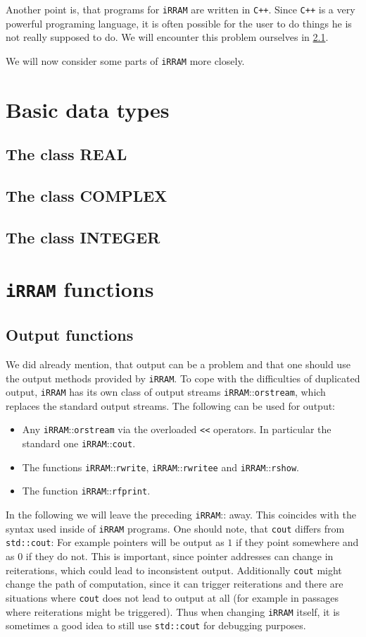 \documentclass{article}
\newcommand{\irram}{\texttt{iRRAM}\xspace}
\newcommand{\cc}{\texttt{C++}\xspace}
\newcommand{\ir}[1]{\texttt{#1}}
\newcommand{\code}[1]{\texttt{#1}}
\begin{document}
Another point is, that programs for \irram are written in \cc. Since \cc is a very powerful programing language, it is often possible for the user to do things he is not really supposed to do. We will encounter this problem ourselves in \ref{}.

We will now consider some parts of \irram more closely.

\section{Basic data types}

\subsection{The class REAL}
\subsection{The class COMPLEX}
\subsection{The class INTEGER}

\section{\irram functions}
\subsection{Output functions}

We did already mention, that output can be a problem and that one should use the output methods provided by \irram. To cope with the difficulties of duplicated output, \irram has its own class of output streams \irram::\ir{orstream}, which replaces the standard output streams. The following can be used for output:
\begin{itemize}
\item Any \irram::\ir{orstream} via the overloaded \ir{<<} operators. In particular the standard one \irram::\ir{cout}.
\item The functions \irram::\ir{rwrite}, \irram::\ir{rwritee} and \irram::\ir{rshow}.
\item The function \irram::\ir{rfprint}.
\end{itemize}
In the following we will leave the preceding \irram::\ir{} away. This coincides with the syntax used inside of \irram programs. One should note, that \ir{cout} differs from \code{std::cout}: For example pointers will be output as $1$ if they point somewhere and as $0$ if they do not. This is important, since pointer addresses can change in reiterations, which could lead to inconsistent output. Additionally \ir{cout} might change the path of computation, since it can trigger reiterations and there are situations where \ir{cout} does not lead to output at all (for example in passages where reiterations might be triggered). Thus when changing \irram itself, it is sometimes a good idea to still use \code{std::cout} for debugging purposes.
\end{document}
